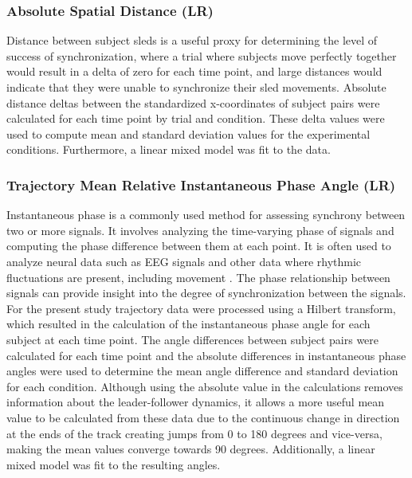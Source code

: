 \documentclass[10pt,a4paper,onecolumn]{article}
\begin{document}
\hypertarget{absolute-spatial-distance-lr}{%
\subsubsection{Absolute Spatial Distance (LR)}\label{absolute-spatial-distance-lr}}

Distance between subject sleds is a useful proxy for determining the level of success of synchronization, where a trial where subjects move perfectly together would result in a delta of zero for each time point, and large distances would indicate that they were unable to synchronize their sled movements. Absolute distance deltas between the standardized x-coordinates of subject pairs were calculated for each time point by trial and condition. These delta values were used to compute mean and standard deviation values for the experimental conditions. Furthermore, a linear mixed model was fit to the data.

\hypertarget{trajectory-mean-relative-instantaneous-phase-angle-lr}{%
\subsubsection{Trajectory Mean Relative Instantaneous Phase Angle (LR)}\label{trajectory-mean-relative-instantaneous-phase-angle-lr}}

Instantaneous phase is a commonly used method for assessing synchrony between two or more signals. It involves analyzing the time-varying phase of signals and computing the phase difference between them at each point. It is often used to analyze neural data such as EEG signals and other data where rhythmic fluctuations are present, including movement \autocite{varletComputationContinuousRelative2011a}. The phase relationship between signals can provide insight into the degree of synchronization between the signals. For the present study trajectory data were processed using a Hilbert transform, which resulted in the calculation of the instantaneous phase angle for each subject at each time point. The angle differences between subject pairs were calculated for each time point and the absolute differences in instantaneous phase angles were used to determine the mean angle difference and standard deviation for each condition. Although using the absolute value in the calculations removes information about the leader-follower dynamics, it allows a more useful mean value to be calculated from these data due to the continuous change in direction at the ends of the track creating jumps from 0 to 180 degrees and vice-versa, making the mean values converge towards 90 degrees. Additionally, a linear mixed model was fit to the resulting angles.
\end{document}
